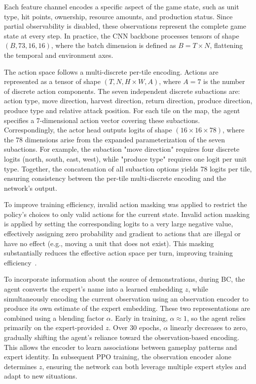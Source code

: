 \documentclass[10pt,twocolumn,letterpaper]{article}
\begin{document}
Each feature channel encodes a specific aspect of the game state, such as unit type, hit points, ownership, resource amounts, and production status. Since partial observability is disabled, these observations represent the complete game state at every step. In practice, the CNN backbone processes tensors of shape \((B, 73, 16, 16)\), where the batch dimension is defined as \(B = T \times N\), flattening the temporal and environment axes.

The action space follows a multi-discrete per-tile encoding. Actions are represented as a tensor of shape \((T, N, H \times W, A)\), where \(A = 7\) is the number of discrete action components. The seven independent discrete subactions are: action type, move direction, harvest direction, return direction, produce direction, produce type and relative attack position. For each tile on the map, the agent specifies a 7-dimensional action vector covering these subactions. Correspondingly, the actor head outputs logits of shape \((16 \times 16 \times 78)\), where the 78 dimensions arise from the expanded parameterization of the seven subactions. For example, the subaction "move direction" requires four discrete logits (north, south, east, west), while "produce type" requires one logit per unit type. Together, the concatenation of all subaction options yields 78 logits per tile, ensuring consistency between the per-tile multi-discrete encoding and the network’s output.

To improve training efficiency, invalid action masking was applied to restrict the policy’s choices to only valid actions for the current state. Invalid action masking is applied by setting the corresponding logits to a very large negative value, effectively assigning zero probability and gradient to actions that are illegal or have no effect (e.g., moving a unit that does not exist). This masking substantially reduces the effective action space per turn, improving training efficiency~\cite{huang2020invalid}.

To incorporate information about the source of demonstrations, during BC, the agent converts the expert’s name into a learned embedding \(z\), while simultaneously encoding the current observation using an observation encoder to produce its own estimate of the expert embedding. These two representations are combined using a blending factor \(\alpha\). Early in training, \(\alpha \approx 1\), so the agent relies primarily on the expert-provided \(z\). Over 30 epochs, \(\alpha\) linearly decreases to zero, gradually shifting the agent’s reliance toward the observation-based encoding. This allows the encoder to learn associations between gameplay patterns and expert identity. In subsequent PPO training, the observation encoder alone determines \(z\), ensuring the network can both leverage multiple expert styles and adapt to new situations.
\end{document}
